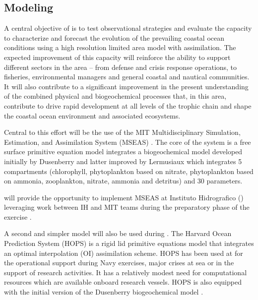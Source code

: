 
\subsection{Modeling}

A central objective of \proj is to test observational strategies and
evaluate the capacity to characterize and forecast the evolution of
the prevailing coastal ocean conditions using a high resolution
limited area model with assimilation. The expected improvement of this
capacity will reinforce the ability to support different sectors in
the area -- from defense and crisis response operations, to fisheries,
environmental managers and general coastal and nautical
communities. It will also contribute to a significant improvement in
the present understanding of the combined physical and biogeochemical
processes that, in this area, contribute to drive rapid development at
all levels of the trophic chain and shape the coastal ocean
environment and associated ecosystems.  

Central to this effort will be the use of the MIT Multidisciplinary
Simulation, Estimation, and Assimilation System (MSEAS)
. The core of the system is a free surface primitive
equation model  integrates a
biogeochemical model developed initially by Dusenberry 
and latter improved by Lermusiaux  which integrates 5
compartments (chlorophyll, phytoplankton based on nitrate,
phytoplankton based on ammonia, zooplankton, nitrate, ammonia and
detritus) and 30 parameters.

\proj will provide the opportunity to implement MSEAS at Instituto
Hidrografico (\inste) leveraging work between IH and MIT teams during
the preparatory phase of the exercise .

A second and simpler model will also be used during \proje.  The
Harvard Ocean Prediction System (HOPS) is a rigid lid primitive
equations model that integrates an optimal interpolation (OI)
assimilation scheme. HOPS has been used at \inst for the operational
support during Navy exercises, major crises at sea or in the support
of research activities. It has a relatively modest need for
computational resources which are available onboard research
vessels. HOPS is also equipped with the initial version of the
Dusenberry biogeochemical model .

